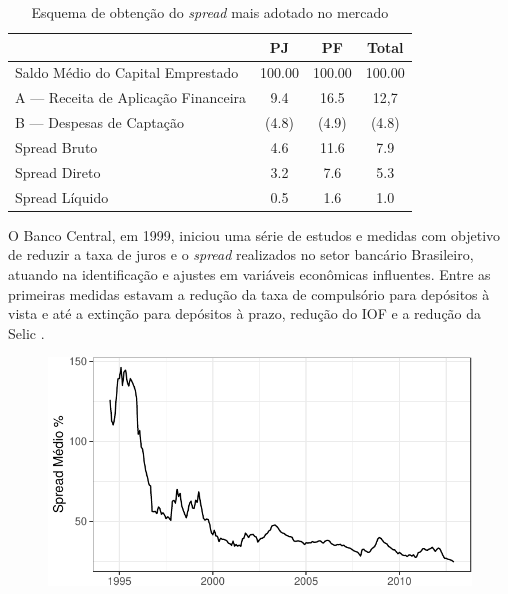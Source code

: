 \documentclass[12pt,openright,oneside,a4paper,chapter=TITLE,section=TITLE,subsection=TITLE,english,french,spanish,portugues,sumario=tradicional]{abntex2}
\begin{document}
\begin{table}[b]
 \centering
   \caption{Esquema de obtenção do \emph{spread} mais adotado no mercado} 
    \label{tab:spread.tb}
     \begin{tabular}{l|c|c|c}
      \hline
                                           &   PJ   &   PF    & Total \\
       \hline
       Saldo Médio do Capital Emprestado   & 100.00 & 100.00  & 100.00 \\
       A — Receita de Aplicação Financeira & 9.4    & 16.5    & 12,7   \\
       B — Despesas de Captação            & (4.8)  & (4.9)   & (4.8)  \\   
       Spread Bruto                        & 4.6    & 11.6    & 7.9    \\
       Spread Direto                       & 3.2    & 7.6     & 5.3    \\
       Spread Líquido                      & 0.5    & 1.6     & 1.0    \\
       \hline
       \end{tabular}
\end{table}

O Banco Central, em 1999, iniciou uma série de estudos e medidas com objetivo
de reduzir a taxa de juros e o \emph{spread} realizados no setor bancário
Brasileiro, atuando na identificação e ajustes em variáveis econômicas
influentes. Entre as primeiras medidas estavam a redução da taxa de compulsório
para depósitos à vista e até a extinção para depósitos à prazo, redução do IOF
e a redução da Selic \cite{BCB:2000}.

\begin{figure}

\begin{center}\includegraphics{12-exportedfigures/average spread-1} \end{center}
\label{fig:spread2012}
\end{figure}
\end{document}
